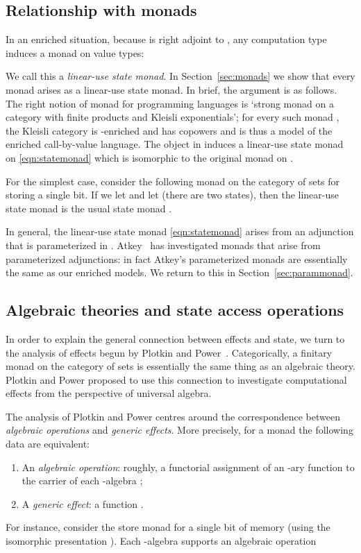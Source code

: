 \documentclass{LMCS}
\begin{document}
\subsection{Relationship with monads}
\label{sec:intro:monads}


In an enriched situation, because  is right adjoint to 
,
any computation type  induces a monad on value types:

We call this a \emph{linear-use state monad}.
In Section~\ref{sec:monads} we show that 
every monad arises as a linear-use state monad. 
In brief, the argument is as follows.
The right notion of monad for programming languages is
`strong monad  on a category  with finite products and 
Kleisli exponentials';
for every such monad ,
the Kleisli category  is -enriched and has copowers
and is thus a model of the enriched call-by-value language.
The object  in  
induces a linear-use state monad
on   \eqref{eqn:statemonad} 
which is isomorphic to
the original monad  on .

For the simplest case, consider the following monad on the category
of sets for storing a single bit. 
If we let  and 
let  (there are two states), 
then the linear-use state monad is the usual state monad
.

In general, the linear-use state monad \eqref{eqn:statemonad} arises
from an adjunction that is parameterized in .
Atkey~\cite{a-parammonad} has investigated monads that arise from
parameterized adjunctions: in fact Atkey's parameterized monads are
essentially the same as our enriched models.  We return to this in
Section~\ref{sec:parammonad}.

\subsection{Algebraic theories and state access operations}
In order to explain the general connection between
effects and state, we turn to the analysis of effects begun by Plotkin and Power~\cite{Plotkin:Power:03}.
Categorically, a finitary monad on the category of sets
is essentially the same thing as an algebraic  theory.
Plotkin and Power proposed to use this
connection 
to investigate computational effects from the perspective of universal algebra.

The analysis of Plotkin and Power centres around the 
correspondence between \emph{algebraic operations} and \emph{generic effects}.
More precisely, for a monad  the following data are equivalent:
\begin{enumerate}
\item An \emph{algebraic operation}:
roughly, a functorial assignment of an -ary function
 to the carrier of each -algebra ;
\item A \emph{generic effect}: a function . 
\end{enumerate}
For instance, 
consider the store monad for a single bit of memory 
(using the isomorphic presentation 
).
Each -algebra 
 supports 
an algebraic operation 
\end{document}
